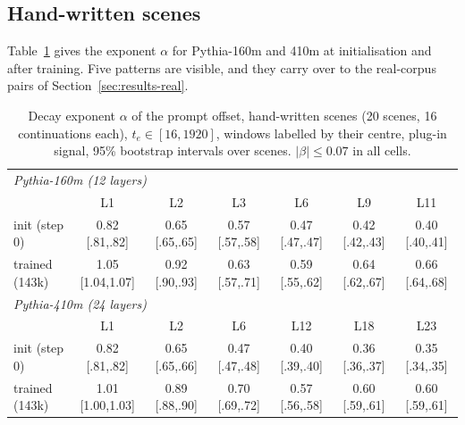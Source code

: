 \documentclass[11pt]{article}
\theoremstyle{definition}
\theoremstyle{remark}
\begin{document}
\subsection{Hand-written scenes}
\label{sec:results-hand}
Table~\ref{tab:alpha} gives the exponent $\alpha$ for Pythia-160m and 410m at initialisation and after training. Five patterns are visible, and they carry over to the real-corpus pairs of Section~\ref{sec:results-real}.
\begin{table}[t]
\centering\small
\begin{tabular}{lcccccc}
\toprule
\multicolumn{7}{l}{\emph{Pythia-160m (12 layers)}}\\
 & L1 & L2 & L3 & L6 & L9 & L11 \\
\midrule
init (step 0)   & 0.82 {\scriptsize[.81,.82]} & 0.65 {\scriptsize[.65,.65]} & 0.57 {\scriptsize[.57,.58]} & 0.47 {\scriptsize[.47,.47]} & 0.42 {\scriptsize[.42,.43]} & 0.40 {\scriptsize[.40,.41]} \\
trained (143k)  & 1.05 {\scriptsize[1.04,1.07]} & 0.92 {\scriptsize[.90,.93]} & 0.63 {\scriptsize[.57,.71]} & 0.59 {\scriptsize[.55,.62]} & 0.64 {\scriptsize[.62,.67]} & 0.66 {\scriptsize[.64,.68]} \\
\midrule
\multicolumn{7}{l}{\emph{Pythia-410m (24 layers)}}\\
 & L1 & L2 & L6 & L12 & L18 & L23 \\
\midrule
init (step 0)   & 0.82 {\scriptsize[.81,.82]} & 0.65 {\scriptsize[.65,.66]} & 0.47 {\scriptsize[.47,.48]} & 0.40 {\scriptsize[.39,.40]} & 0.36 {\scriptsize[.36,.37]} & 0.35 {\scriptsize[.34,.35]} \\
trained (143k)  & 1.01 {\scriptsize[1.00,1.03]} & 0.89 {\scriptsize[.88,.90]} & 0.70 {\scriptsize[.69,.72]} & 0.57 {\scriptsize[.56,.58]} & 0.60 {\scriptsize[.59,.61]} & 0.60 {\scriptsize[.59,.61]} \\
\bottomrule
\end{tabular}
\caption{Decay exponent $\alpha$ of the prompt offset, hand-written scenes (20 scenes, 16 continuations each), $t_e\in[16,1920]$, windows labelled by their centre, plug-in signal, 95\% bootstrap intervals over scenes. $|\beta|\le0.07$ in all cells.}
\label{tab:alpha}
\end{table}
\end{document}
